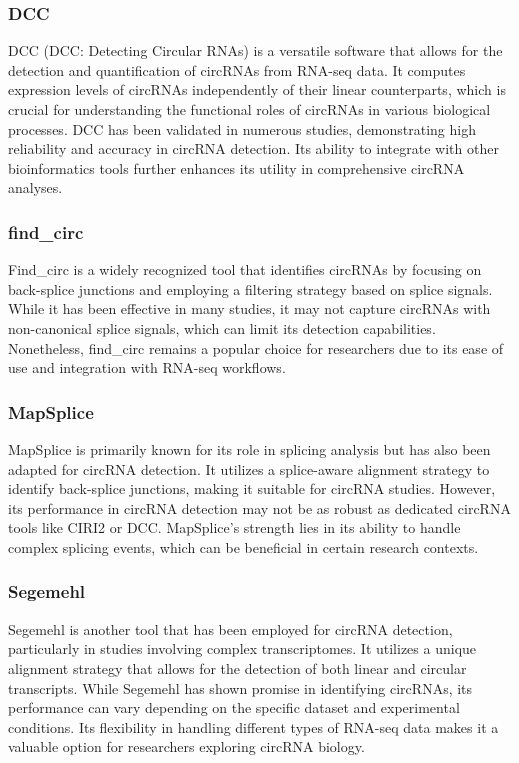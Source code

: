 \subsubsection{DCC}
DCC (DCC: Detecting Circular RNAs) is a versatile software that allows for the
detection and quantification of circRNAs from RNA-seq data. It computes
expression levels of circRNAs independently of their linear counterparts, which
is crucial for understanding the functional roles of circRNAs in various
biological processes\supercite{jakobi_profiling_2016,man_profiling_2020}. DCC has been
validated in numerous studies, demonstrating high reliability and accuracy in
circRNA detection\supercite{paraboschi_interpreting_2018}. Its ability to
integrate with other bioinformatics tools further enhances its utility in
comprehensive circRNA analyses.

\subsubsection{find\_circ}
Find\_circ is a widely recognized tool that identifies circRNAs by focusing on
back-splice junctions and employing a filtering strategy based on splice
signals. While it has been effective in many studies, it may not capture
circRNAs with non-canonical splice signals, which can limit its detection
capabilities\supercite{sekar_circular_2018,liu_prkra_2022}. Nonetheless, find\_circ
remains a popular choice for researchers due to its ease of use and integration
with RNA-seq workflows.

\subsubsection{MapSplice}
MapSplice is primarily known for its role in splicing analysis but has also been
adapted for circRNA detection. It utilizes a splice-aware alignment strategy to
identify back-splice junctions, making it suitable for circRNA studies. However,
its performance in circRNA detection may not be as robust as dedicated circRNA
tools like CIRI2 or DCC\supercite{zeng_comprehensive_2017,chuang_nclscan_2016}. MapSplice's
strength lies in its ability to handle complex splicing events, which can be
beneficial in certain research contexts.

\subsubsection{Segemehl}
Segemehl is another tool that has been employed for circRNA detection,
particularly in studies involving complex transcriptomes. It utilizes a unique
alignment strategy that allows for the detection of both linear and circular
transcripts. While Segemehl has shown promise in identifying circRNAs, its
performance can vary depending on the specific dataset and experimental
conditions\supercite{gao_ciri_2015,zeng_comprehensive_2017}. Its flexibility in handling
different types of RNA-seq data makes it a valuable option for researchers
exploring circRNA biology.

